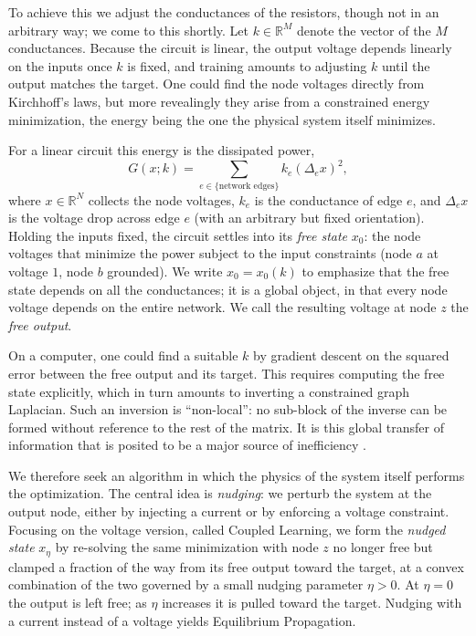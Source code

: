 \documentclass{siamart}
\begin{document}
To achieve this we adjust the conductances of the resistors, though not in an arbitrary way; we come to this shortly. Let $k \in \mathbb{R}^{M}$ denote the vector of the $M$ conductances. Because the circuit is linear, the output voltage depends linearly on the inputs once $k$ is fixed, and training amounts to adjusting $k$ until the output matches the target. One could find the node voltages directly from Kirchhoff's laws, but more revealingly they arise from a constrained energy minimization, the energy being the one the physical system itself minimizes.

For a linear circuit this energy is the dissipated power,
\[G(x ; k) = \sum_{e \in \{\text{network edges}\}}k_e(\Delta_e x)^2,\]
where $x \in \mathbb{R}^N$ collects the node voltages, $k_e$ is the conductance of edge $e$, and $\Delta_e x$ is the voltage drop across edge $e$ (with an arbitrary but fixed orientation). Holding the inputs fixed, the circuit settles into its \emph{free state} $x_0$: the node voltages that minimize the power subject to the input constraints (node $a$ at voltage $1$, node $b$ grounded). We write $x_0 = x_0(k)$ to emphasize that the free state depends on all the conductances; it is a global object, in that every node voltage depends on the entire network. We call the resulting voltage at node $z$ the \emph{free output}.

On a computer, one could find a suitable $k$ by gradient descent on the squared error between the free output and its target. This requires computing the free state explicitly, which in turn amounts to inverting a constrained graph Laplacian. Such an inversion is ``non-local'': no sub-block of the inverse can be formed without reference to the rest of the matrix. It is this global transfer of information that is posited to be a major source of inefficiency \cite{stern2021learning, dillavou2022demonstration}.

We therefore seek an algorithm in which the physics of the system itself performs the optimization. The central idea is \emph{nudging}: we perturb the system at the output node, either by injecting a current or by enforcing a voltage constraint. Focusing on the voltage version, called Coupled Learning, we form the \emph{nudged state} $x_\eta$ by re-solving the same minimization with node $z$ no longer free but clamped a fraction of the way from its free output toward the target, at a convex combination of the two governed by a small nudging parameter $\eta > 0$. At $\eta = 0$ the output is left free; as $\eta$ increases it is pulled toward the target. Nudging with a current instead of a voltage yields Equilibrium Propagation.
\end{document}
